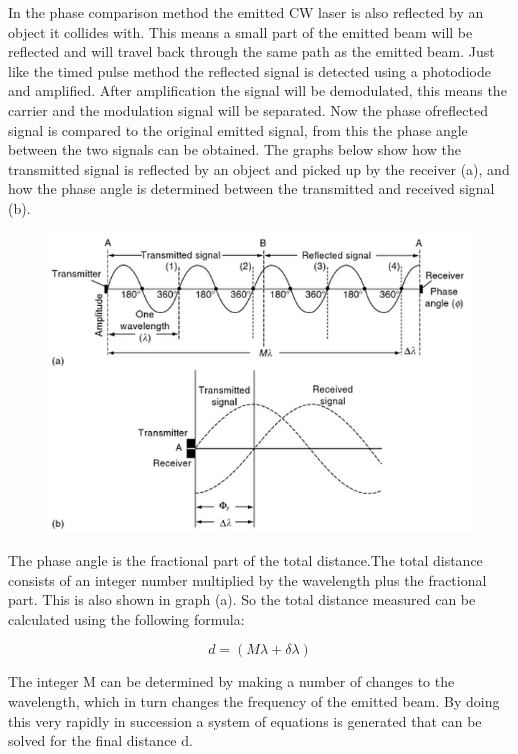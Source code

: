 \documentclass{article}
\begin{document}
In the phase comparison method the emitted CW laser is also reflected by an object it collides with. This means a small part of the emitted beam will be reflected and will travel back through the same path as the emitted beam. Just like the timed pulse method the reflected signal is detected using a photodiode and amplified. After amplification the signal will be demodulated, this means the carrier and the modulation signal will be separated. Now the phase ofreflected signal is compared to the original emitted signal, from this the phase angle between the two signals can be obtained. The graphs below show how the transmitted signal is reflected by an object and picked up by the receiver (a), and how the phase angle is determined between the transmitted and received signal (b). 



\begin{figure}[H]
	\centering
	\includegraphics[scale=0.8]{figures/Phaseangle}
	\caption{ }
	\label{lidar3}
\end{figure}

The phase angle is the fractional part of the total distance.The total distance consists of an integer number multiplied by the wavelength plus the fractional part. This is also shown in graph (a). So the total distance measured can be calculated using the following formula:

\begin{equation}
d = (M \lambda + \delta \lambda)
\end{equation}

The integer M can be determined by making a number of changes to the wavelength, which in turn changes the frequency of the emitted beam. By doing this very rapidly in succession a system of equations is generated that can be solved for the final distance d.
\end{document}
